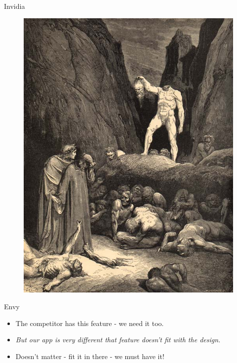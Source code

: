 \documentclass[12pt,xcolor=x11names]{beamer}
\begin{document}
\begin{frame}{Invidia}
    \begin{figure}
        \centering \includegraphics[height=0.75\textheight]{images/envy.jpg}
    \end{figure}
\end{frame}
\begin{frame}{Envy}
    \begin{itemize}
        \item The competitor has this feature - we need it too.
            \pause
        \item \emph{But our app is very different that feature doesn't fit with
            the design.} 
            \pause
        \item Doesn't matter - fit it in there - we must have it!
    \end{itemize}
\end{frame}
\end{document}
